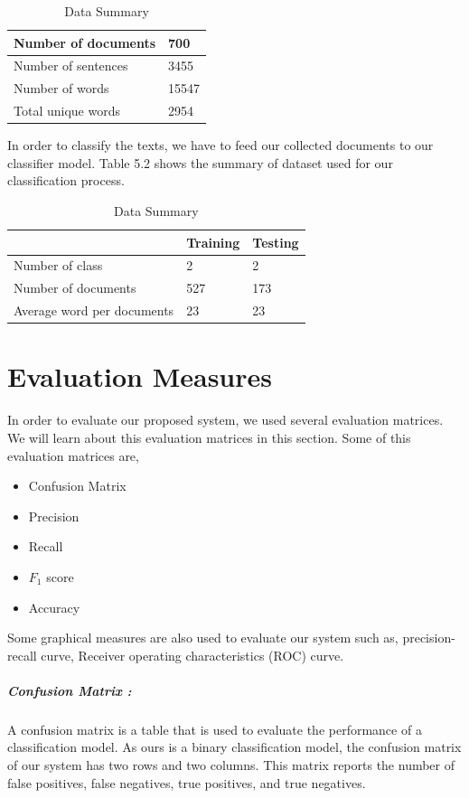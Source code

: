 \renewcommand{\arraystretch}{1.3}
\begin{table}[h!]
\begin{center}
\caption{Data Summary}
\begin{tabular}{|m{6cm} | m{3cm}|}
\hline
     Number of documents & 700 \\
\hline
     Number of sentences & 3455\\
\hline 
     Number of words & 15547\\
\hline 
     Total unique words & 2954\\
\hline
\end{tabular}
\end{center}
\end{table}
\noindent
In order to classify the texts, we have to feed our collected documents to our classifier model. Table 5.2 shows the summary of dataset used for our classification process.
\renewcommand{\arraystretch}{1.2}
\begin{table}[h!]
\begin{center}
\caption{Data Summary}
\begin{tabular}{|m{6cm} | m{3cm}| m{3cm}|}
\hline
     & Training & Testing \\
\hline
     Number of class & 2 & 2\\
\hline 
     Number of documents & 527 & 173\\
\hline 
     Average word per documents & 23 & 23\\
\hline
\end{tabular}
\end{center}
\end{table}

\section{Evaluation Measures}
In order to evaluate our proposed system, we used several evaluation matrices. We will learn about this  evaluation matrices in this section. Some of this evaluation matrices are,
\begin{itemize}
    \item Confusion Matrix
    \item Precision
    \item Recall
    \item $F_1$ score
    \item Accuracy 
\end{itemize}
Some graphical measures are also used to evaluate our system such as, precision-recall curve, Receiver operating characteristics (ROC) curve.
\clearpage
\subparagraph{Confusion Matrix :}
A confusion matrix is a table that is used to evaluate the performance of a classification model. As ours is a binary classification model, the confusion matrix of our system has two rows and two columns. This matrix reports the number of false positives, false negatives, true positives, and true negatives.

